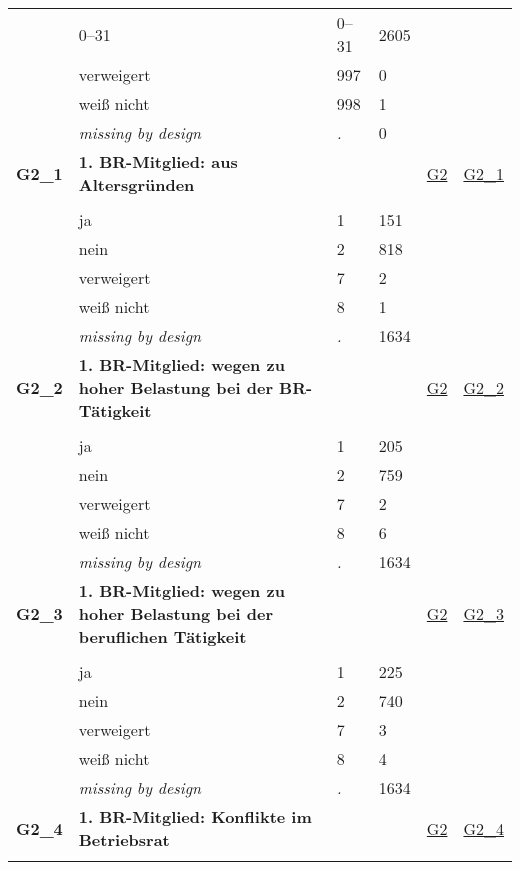 \begin{longtable}{| L{2.45cm} | L{6cm} | C{1.5cm} | R{1cm} | C{2.25cm} | C{2.25cm} |}
   & 0--31 & 0--31 & 2605 &  &  \\ 
   & verweigert & 997 & 0 &  &  \\ 
   & weiß nicht & 998 & 1 &  &  \\ 
   & \textit{missing by design} & \textit{.} & 0 &  &  \\ 
   \midrule
\textbf{G2\_1}\label{var:G2:1} & \textbf{1. BR-Mitglied: aus Altersgründen} &  &  & \hyperref[G2]{G2} & \hyperref[var:suf:G2:1]{G2\_1} \\ 
   &  &  &  &  &  \\ 
   & ja & 1 & 151 &  &  \\ 
   & nein & 2 & 818 &  &  \\ 
   & verweigert & 7 & 2 &  &  \\ 
   & weiß nicht & 8 & 1 &  &  \\ 
   & \textit{missing by design} & \textit{.} & 1634 &  &  \\ 
   \midrule
\textbf{G2\_2}\label{var:G2:2} & \textbf{1. BR-Mitglied: wegen zu hoher Belastung bei der BR-Tätigkeit} &  &  & \hyperref[G2]{G2} & \hyperref[var:suf:G2:2]{G2\_2} \\ 
   &  &  &  &  &  \\ 
   & ja & 1 & 205 &  &  \\ 
   & nein & 2 & 759 &  &  \\ 
   & verweigert & 7 & 2 &  &  \\ 
   & weiß nicht & 8 & 6 &  &  \\ 
   & \textit{missing by design} & \textit{.} & 1634 &  &  \\ 
   \midrule
\textbf{G2\_3}\label{var:G2:3} & \textbf{1. BR-Mitglied: wegen zu hoher Belastung bei der beruflichen Tätigkeit} &  &  & \hyperref[G2]{G2} & \hyperref[var:suf:G2:3]{G2\_3} \\ 
   &  &  &  &  &  \\ 
   & ja & 1 & 225 &  &  \\ 
   & nein & 2 & 740 &  &  \\ 
   & verweigert & 7 & 3 &  &  \\ 
   & weiß nicht & 8 & 4 &  &  \\ 
   & \textit{missing by design} & \textit{.} & 1634 &  &  \\ 
   \midrule
\textbf{G2\_4}\label{var:G2:4} & \textbf{1. BR-Mitglied: Konflikte im Betriebsrat} &  &  & \hyperref[G2]{G2} & \hyperref[var:suf:G2:4]{G2\_4} \\ 
   &  &  &  &  &  \\ 

\end{longtable}
